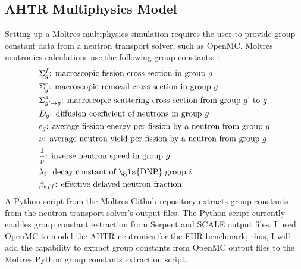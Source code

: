 \subsection{AHTR Multiphysics Model}
\label{sec:ahtr_multiphysics_model}
Setting up a Moltres multiphysics simulation requires the user to provide group 
constant data from a neutron transport solver, such as OpenMC. 
Moltres neutronics calculations use the following group constants:
\cite{lindsay_introduction_2018,park_advancement_2020}: 
\begin{align*}
  &\Sigma^f_{g} \text{: macroscopic fission cross section in group $g$} \\
  &\Sigma^r_{g} \text{: macroscopic removal cross section in group $g$} \\
  &\Sigma^s_{g' \rightarrow g} \text{: macroscopic scattering cross section
  from group $g$' to $g$} \\
  &D_g \text{: diffusion coefficient of neutrons in group $g$} \\
  &\epsilon_g \text{: average fission energy per fission by a neutron from
  group $g$} \\
  &\nu \text{: average neutron yield per fission by a neutron from group
  $g$} \\
  &\frac{1}{v} \text{: inverse neutron speed in group $g$} \\
  &\lambda_i \text{: decay constant of \gls{DNP} group $i$} \\
  &\beta_{eff} \text{: effective delayed neutron fraction}. 
\end{align*}
A Python script from the Moltres Github repository \cite{lindsay_moltres_2017}
extracts group constants from the neutron transport solver's output files.
The Python script currently enables group constant extraction from Serpent 
\cite{leppanen_serpent_2014} and SCALE \cite{bucholz_scale:_1982} output files.
I used OpenMC to model the \gls{AHTR} neutronics for the \gls{FHR} benchmark;
thus, I will add the capability to extract group constants from OpenMC output 
files to the Moltres Python group constants extraction script. 


